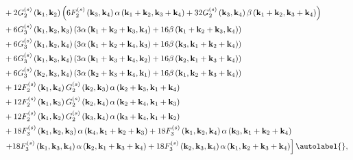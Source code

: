 \begin{align*}
    & +2 G_{2}^{(s)}\left(\mathbf{k}_{1}, \mathbf{k}_{2}\right)\left(6 F_{2}^{(s)}\left(\mathbf{k}_{3}, \mathbf{k}_{4}\right) \alpha\left(\mathbf{k}_{1}+\mathbf{k}_{2}, \mathbf{k}_{3}+\mathbf{k}_{4}\right)+32 G_{2}^{(s)}\left(\mathbf{k}_{3}, \mathbf{k}_{4}\right) \beta\left(\mathbf{k}_{1}+\mathbf{k}_{2}, \mathbf{k}_{3}+\mathbf{k}_{4}\right)\right) \\
    & +6 G_{3}^{(s)}\left(\mathbf{k}_{1}, \mathbf{k}_{2}, \mathbf{k}_{3}\right)\left(3 \alpha\left(\mathbf{k}_{1}+\mathbf{k}_{2}+\mathbf{k}_{3}, \mathbf{k}_{4}\right)+16 \beta\left(\mathbf{k}_{1}+\mathbf{k}_{2}+\mathbf{k}_{3}, \mathbf{k}_{4}\right)\right) \\
    & +6 G_{3}^{(s)}\left(\mathbf{k}_{1}, \mathbf{k}_{2}, \mathbf{k}_{4}\right)\left(3 \alpha\left(\mathbf{k}_{1}+\mathbf{k}_{2}+\mathbf{k}_{4}, \mathbf{k}_{3}\right)+16 \beta\left(\mathbf{k}_{3}, \mathbf{k}_{1}+\mathbf{k}_{2}+\mathbf{k}_{4}\right)\right) \\
    & +6 G_{3}^{(s)}\left(\mathbf{k}_{1}, \mathbf{k}_{3}, \mathbf{k}_{4}\right)\left(3 \alpha\left(\mathbf{k}_{1}+\mathbf{k}_{3}+\mathbf{k}_{4}, \mathbf{k}_{2}\right)+16 \beta\left(\mathbf{k}_{2}, \mathbf{k}_{1}+\mathbf{k}_{3}+\mathbf{k}_{4}\right)\right) \\
    & +6 G_{3}^{(s)}\left(\mathbf{k}_{2}, \mathbf{k}_{3}, \mathbf{k}_{4}\right)\left(3 \alpha\left(\mathbf{k}_{2}+\mathbf{k}_{3}+\mathbf{k}_{4}, \mathbf{k}_{1}\right)+16 \beta\left(\mathbf{k}_{1}, \mathbf{k}_{2}+\mathbf{k}_{3}+\mathbf{k}_{4}\right)\right) \\
    & +12 F_{2}^{(s)}\left(\mathbf{k}_{1}, \mathbf{k}_{4}\right) G_{2}^{(s)}\left(\mathbf{k}_{2}, \mathbf{k}_{3}\right) \alpha\left(\mathbf{k}_{2}+\mathbf{k}_{3}, \mathbf{k}_{1}+\mathbf{k}_{4}\right) \\
    & +12 F_{2}^{(s)}\left(\mathbf{k}_{1}, \mathbf{k}_{3}\right) G_{2}^{(s)}\left(\mathbf{k}_{2}, \mathbf{k}_{4}\right) \alpha\left(\mathbf{k}_{2}+\mathbf{k}_{4}, \mathbf{k}_{1}+\mathbf{k}_{3}\right) \\
    & +12 F_{2}^{(s)}\left(\mathbf{k}_{1}, \mathbf{k}_{2}\right) G_{2}^{(s)}\left(\mathbf{k}_{3}, \mathbf{k}_{4}\right) \alpha\left(\mathbf{k}_{3}+\mathbf{k}_{4}, \mathbf{k}_{1}+\mathbf{k}_{2}\right) \\
    & +18 F_{3}^{(s)}\left(\mathbf{k}_{1}, \mathbf{k}_{2}, \mathbf{k}_{3}\right) \alpha\left(\mathbf{k}_{4}, \mathbf{k}_{1}+\mathbf{k}_{2}+\mathbf{k}_{3}\right)+18 F_{3}^{(s)}\left(\mathbf{k}_{1}, \mathbf{k}_{2}, \mathbf{k}_{4}\right) \alpha\left(\mathbf{k}_{3}, \mathbf{k}_{1}+\mathbf{k}_{2}+\mathbf{k}_{4}\right) \\
    & \left.+18 F_{3}^{(s)}\left(\mathbf{k}_{1}, \mathbf{k}_{3}, \mathbf{k}_{4}\right) \alpha\left(\mathbf{k}_{2}, \mathbf{k}_{1}+\mathbf{k}_{3}+\mathbf{k}_{4}\right)+18 F_{3}^{(s)}\left(\mathbf{k}_{2}, \mathbf{k}_{3}, \mathbf{k}_{4}\right) \alpha\left(\mathbf{k}_{1}, \mathbf{k}_{2}+\mathbf{k}_{3}+\mathbf{k}_{4}\right)\right] \autolabel{},
\end{align*}


